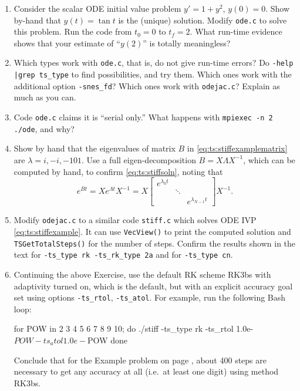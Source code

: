 \begin{enumerate}
\item \label{exer:ts:tan}  Consider the scalar ODE initial value problem $y'=1+y^2$, $y(0)=0$.  Show by-hand that $y(t)=\tan t$ is the (unique) solution.  Modify \texttt{ode.c} to solve this problem.  Run the code from $t_0=0$ to $t_f=2$.  What run-time evidence shows that your estimate of ``$y(2)$'' is totally meaningless?

\item \label{exer:ts:odepossible}  Which \pTS types work with \texttt{ode.c}, that is, do not give run-time errors?  Do \texttt{-help |grep ts\_type} to find possibilities, and try them.  Which ones work with the additional option \texttt{-snes\_fd}?  Which ones work with \texttt{odejac.c}?  Explain as much as you can.

\item \label{exer:ts:odeserial}  Code \texttt{ode.c} claims it is ``serial only.''  What happens with \texttt{mpiexec -n 2 ./ode}, and why?

\item \label{exer:ts:stiffexample}  Show by hand that the eigenvalues of matrix $B$ in \eqref{eq:ts:stiffexamplematrix} are $\lambda=i,-i,-101$.  Use a full eigen-decomposition $B = X \Lambda X^{-1}$, which can be computed by hand, to confirm \eqref{eq:ts:stiffsoln}, noting that
    $$e^{Bt} = X e^{\Lambda t} X^{-1} = X \begin{bmatrix} e^{\lambda_0 t} &  &  \\
                       & \ddots &  \\
                       & & e^{\lambda_{N-1} t} \end{bmatrix} X^{-1}.$$

\item \label{exer:ts:stiffcode}  Modify \texttt{odejac.c} to a similar code \texttt{stiff.c} which solves ODE IVP \eqref{eq:ts:stiffexample}.  It can use \texttt{VecView()} to print the computed solution and \texttt{TSGetTotalSteps()} for the number of steps.  Confirm the results shown in the text for \texttt{-ts\_type rk -ts\_rk\_type 2a} and for \texttt{-ts\_type cn}.

\item \label{exer:ts:stiffadaptive}  Continuing the above Exercise, use the default RK scheme RK3bs with adaptivity turned on, which is the default, but with an explicit accuracy goal set using options \texttt{-ts\_rtol}, \texttt{-ts\_atol}.  For example, run the following Bash loop:
\begin{code}
for POW in 2 3 4 5 6 7 8 9 10; do
    ./stiff -ts_type rk -ts_rtol 1.0e-$POW -ts_atol 1.0e-$POW
done
\end{code}
Conclude that for the Example problem on page \pageref{ex:ts:odestiff}, about 400 steps are necessary to get any accuracy at all (i.e.~at least one digit) using method RK3bs.


\end{enumerate}
